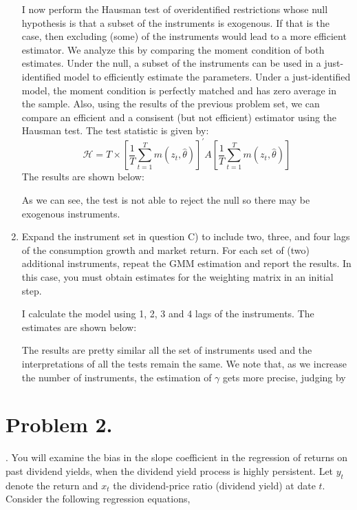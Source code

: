 \documentclass[12pt,twoside]{article}
\begin{document}
\begin{enumerate}[label = \Alph*)]
\begin{solution}
        I now perform the Hausman test of overidentified restrictions whose null hypothesis is that a subset of the instruments is exogenous. If that is the case, then excluding (some) of the instruments would lead to a more efficient estimator. We analyze this by comparing the moment condition of both estimates. Under the null, a subset of the instruments can be used in a just-identified model to efficiently estimate the parameters. Under a just-identified model, the moment condition is perfectly matched and has zero average in the sample. Also, using the results of the previous problem set, we can compare an efficient and a consisent (but not efficient) estimator using the Hausman test. The test statistic is given by:
        \[
            \mathcal H = T \times \left[\frac{1}{T}\sum_{t=1}^T m\left(z_t, \widehat\theta\right)\right]^\prime A \left[\frac{1}{T}\sum_{t=1}^T m\left(z_t, \widehat\theta\right)\right]
        \]
        The results are shown below:
        \begin{center}
            
        \end{center}
        As we can see, the test is not able to reject the null so there may be exogenous instruments.
    \end{solution}
    \item Expand the instrument set in question C) to include two, three, and four lags of the consumption growth and market return. For each set of (two) additional instruments, repeat the GMM estimation and report the results. In this case, you must obtain estimates for the weighting matrix in an initial step.
    \begin{solution}
        I calculate the model using 1, 2, 3 and 4 lags of the instruments. The  estimates are shown below:
        \begin{center}
            
        \end{center}
        The results are pretty similar all the set of instruments used and the interpretations of all the tests remain the same. We note that, as we increase the number of instruments, the estimation of \(\gamma\) gets more precise, judging by 
    \end{solution}
\end{enumerate}

\newpage 

\section{Problem 2.}
\citep{stambaugh1999predictive}. You will examine the bias in the slope coefficient in the regression of returns on past dividend yields, when the dividend yield process is highly persistent. Let \(y_t\) denote the return and \(x_t\) the dividend-price ratio (dividend yield) at date \(t\). Consider the following regression equations,
\end{document}
